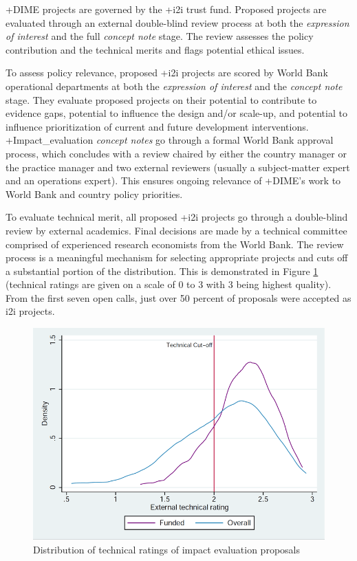 \documentclass[
]{book}
\begin{document}
+DIME\textbar{} projects are governed by the +i2i\textbar{} trust fund. Proposed projects are evaluated through an external double-blind review process at both the \emph{expression of interest} and the full \emph{concept note} stage. The review assesses the policy contribution and the technical merits and flags potential ethical issues.

To assess policy relevance, proposed +i2i\textbar{} projects are scored by World Bank operational departments at both the \emph{expression of interest} and the \emph{concept note} stage. They evaluate proposed projects on their potential to contribute to evidence gaps, potential to influence the design and/or scale-up, and potential to influence prioritization of current and future development interventions. +Impact\_evaluation\textbar{} \emph{concept notes} go through a formal World Bank approval process, which concludes with a review chaired by either the country manager or the practice manager and two external reviewers (usually a subject-matter expert and an operations expert). This ensures ongoing relevance of +DIME\textbar's work to World Bank and country policy priorities.

To evaluate technical merit, all proposed +i2i\textbar{} projects go through a double-blind review by external academics. Final decisions are made by a technical committee comprised of experienced research economists from the World Bank. The review process is a meaningful mechanism for selecting appropriate projects and cuts off a substantial portion of the distribution. This is demonstrated in Figure \ref{fig:dimefigure5} (technical ratings are given on a scale of 0 to 3 with 3 being highest quality). From the first seven open calls, just over 50 percent of proposals were accepted as i2i projects.

\begin{figure}
\includegraphics[width=1\linewidth]{./assets/dime/dimefigure5web} \caption{Distribution of technical ratings of impact evaluation proposals}\label{fig:dimefigure5}
\end{figure}
\end{document}
